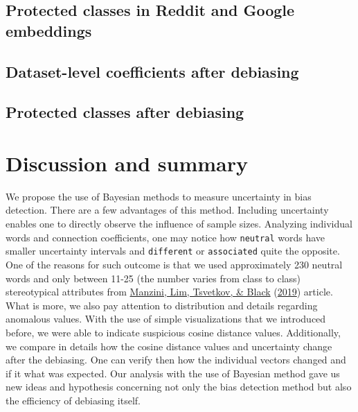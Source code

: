 \documentclass[
  12pt,
]{book}
\begin{document}
\hypertarget{protected-classes-in-reddit-and-google-embeddings}{%
\section{Protected classes in Reddit and Google embeddings}\label{protected-classes-in-reddit-and-google-embeddings}}

\hypertarget{dataset-level-coefficients-after-debiasing}{%
\section{Dataset-level coefficients after debiasing}\label{dataset-level-coefficients-after-debiasing}}

\hypertarget{protected-classes-after-debiasing}{%
\section{Protected classes after debiasing}\label{protected-classes-after-debiasing}}

\hypertarget{discussion-and-summary}{%
\chapter{Discussion and summary}\label{discussion-and-summary}}

We propose the use of Bayesian methods to measure uncertainty in bias detection. There are a few advantages of this method. Including uncertainty enables one to directly observe the influence of sample sizes. Analyzing individual words and connection coefficients, one may notice how \texttt{neutral} words have smaller uncertainty intervals and \texttt{different} or \texttt{associated} quite the opposite. One of the reasons for such outcome is that we used approximately 230 neutral words and only between 11-25 (the number varies from class to class) stereotypical attributes from \protect\hyperlink{ref-Manzini2019blackToCriminal}{Manzini, Lim, Tsvetkov, \& Black} (\protect\hyperlink{ref-Manzini2019blackToCriminal}{2019}) article. What is more, we also pay attention to distribution and details regarding anomalous values. With the use of simple visualizations that we introduced before, we were able to indicate suspicious cosine distance values. Additionally, we compare in details how the cosine distance values and uncertainty change after the debiasing. One can verify then how the individual vectors changed and if it what was expected. Our analysis with the use of Bayesian method gave us new ideas and hypothesis concerning not only the bias detection method but also the efficiency of debiasing itself.
\end{document}

